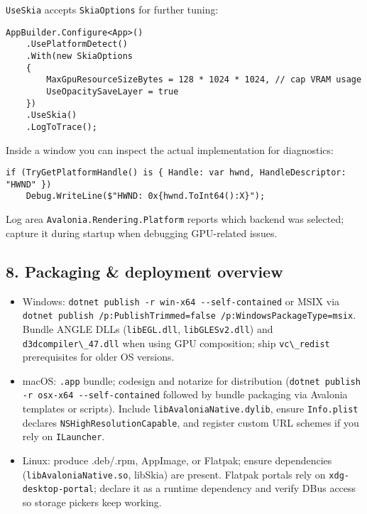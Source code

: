 \passthrough{\lstinline!UseSkia!} accepts
\passthrough{\lstinline!SkiaOptions!} for further tuning:

\begin{lstlisting}
AppBuilder.Configure<App>()
    .UsePlatformDetect()
    .With(new SkiaOptions
    {
        MaxGpuResourceSizeBytes = 128 * 1024 * 1024, // cap VRAM usage
        UseOpacitySaveLayer = true
    })
    .UseSkia()
    .LogToTrace();
\end{lstlisting}

Inside a window you can inspect the actual implementation for
diagnostics:

\begin{lstlisting}
if (TryGetPlatformHandle() is { Handle: var hwnd, HandleDescriptor: "HWND" })
    Debug.WriteLine($"HWND: 0x{hwnd.ToInt64():X}");
\end{lstlisting}

Log area \passthrough{\lstinline!Avalonia.Rendering.Platform!} reports
which backend was selected; capture it during startup when debugging
GPU-related issues.

\subsection{8. Packaging \& deployment
overview}\label{packaging-deployment-overview}

\begin{itemize}
\tightlist
\item
  Windows:
  \passthrough{\lstinline!dotnet publish -r win-x64 --self-contained!}
  or MSIX via
  \passthrough{\lstinline!dotnet publish /p:PublishTrimmed=false /p:WindowsPackageType=msix!}.
  Bundle ANGLE DLLs (\passthrough{\lstinline!libEGL.dll!},
  \passthrough{\lstinline!libGLESv2.dll!}) and
  \passthrough{\lstinline!d3dcompiler\_47.dll!} when using GPU
  composition; ship \passthrough{\lstinline!vc\_redist!} prerequisites
  for older OS versions.
\item
  macOS: \passthrough{\lstinline!.app!} bundle; codesign and notarize
  for distribution
  (\passthrough{\lstinline!dotnet publish -r osx-x64 --self-contained!}
  followed by bundle packaging via Avalonia templates or scripts).
  Include \passthrough{\lstinline!libAvaloniaNative.dylib!}, ensure
  \passthrough{\lstinline!Info.plist!} declares
  \passthrough{\lstinline!NSHighResolutionCapable!}, and register custom
  URL schemes if you rely on \passthrough{\lstinline!ILauncher!}.
\item
  Linux: produce .deb/.rpm, AppImage, or Flatpak; ensure dependencies
  (\passthrough{\lstinline!libAvaloniaNative.so!}, libSkia) are present.
  Flatpak portals rely on \passthrough{\lstinline!xdg-desktop-portal!};
  declare it as a runtime dependency and verify DBus access so storage
  pickers keep working.
\end{itemize}

